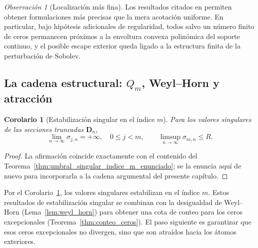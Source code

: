 \documentclass[12pt,a4paper]{article}
\newtheorem{corollary}{Corolario}
\theoremstyle{definition}
\theoremstyle{remark}
\newtheorem{remark}{Observación}
\begin{document}
\begin{remark}[Localización más fina]
  Los resultados citados en \cite{lopez1999zero,lopez2001sobolev,marcellan2015sobolev} permiten obtener formulaciones más precisas que la mera acotación uniforme. En particular, bajo hipótesis adicionales de regularidad, todos salvo un número finito de ceros permanecen próximos a la envoltura convexa polinómica del soporte continuo, y el posible escape exterior queda ligado a la estructura finita de la perturbación de Sobolev.
\end{remark}

\subsection{La cadena estructural: $Q_m$, Weyl--Horn y atracción}\label{sec:cadena_Qm}

\begin{corollary}[Estabilización singular en el índice $m$]\label{cor:estabilizacion}
  Para los valores singulares de las secciones truncadas $\mathbf{D}_n$,
  \[
    \lim_{n\to\infty}\sigma_{j,n}=+\infty,\quad 0\le j<m,
    \qquad
    \limsup_{n\to\infty}\sigma_{m,n}\le R.
  \]
\end{corollary}

\begin{proof}
  La afirmación coincide exactamente con el contenido del Teorema~\ref{thm:umbral_singular_indice_m_enunciado}; se la enuncia aquí de nuevo para incorporarla a la cadena argumental del presente capítulo.
\end{proof}

Por el Corolario~\ref{cor:estabilizacion}, los valores singulares estabilizan en el índice $m$. Estos resultados de estabilización singular se combinan con la desigualdad de Weyl--Horn (Lema~\ref{lem:weyl_horn}) para obtener una cota de conteo para los ceros excepcionales (Teorema~\ref{thm:conteo_ceros}). El paso siguiente es garantizar que esos ceros excepcionales no divergen, sino que son atraídos hacia los átomos exteriores.
\end{document}
